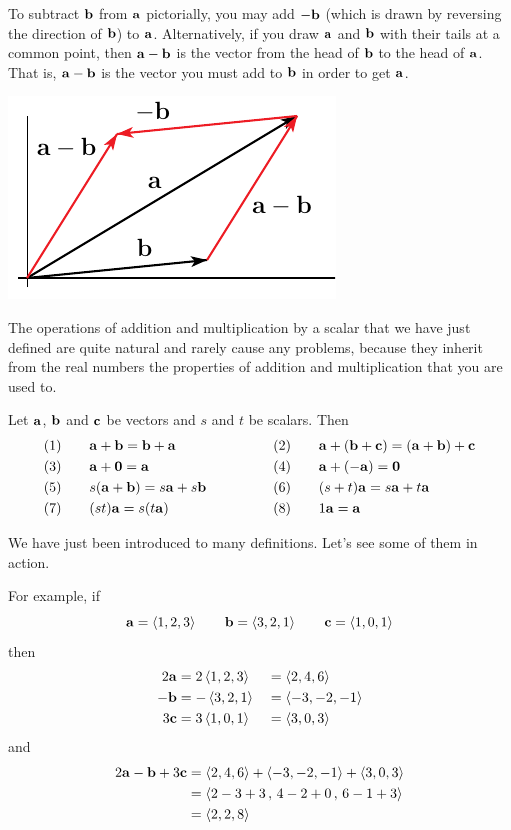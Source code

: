 To subtract $\mathbf{b}$ from $\mathbf{a}$ pictorially, 
you may add $-\mathbf{b}$ (which is drawn by reversing the direction of $\mathbf{b}$)
 to $\mathbf{a}$. Alternatively,
if you draw $\mathbf{a}$ and $\mathbf{b}$ with their tails at a common point,
then $\mathbf{a}-\mathbf{b}$ is the vector from the head of $\mathbf{b}$ to
the head of $\mathbf{a}$. That is, $\mathbf{a}-\mathbf{b}$ is the vector you
must add to $\mathbf{b}$ in order to get $\mathbf{a}$.
\begin{efig}
  \begin{center}
  \includegraphics{subtract.pdf}
  \end{center}
\end{efig}


The operations of addition and multiplication by a scalar that we have just
defined are quite natural and rarely cause any problems, because 
they inherit from the real numbers the properties of  addition and 
multiplication that you are used to. 
\begin{theorem}
                    \label{thm:addScalMult}
Let $\mathbf{a}$, $\mathbf{b}$ and $\mathbf{c}$ be vectors and $s$ and $t$ be scalars. Then 
\begin{alignat*}{5}
& (1)\quad&&\mathbf{a}+\mathbf{b}=\mathbf{b}+\mathbf{a} \qquad\qquad\qquad
&& (2)\quad&&\mathbf{a}+(\mathbf{b}+\mathbf{c})=(\mathbf{a}+\mathbf{b})+\mathbf{c}\\
& (3) &&\mathbf{a}+\mathbf{0} =\mathbf{a} 
&& (4) &&\mathbf{a}+(-\mathbf{a})=\mathbf{0}\\
& (5) &&s(\mathbf{a}+\mathbf{b})=s\mathbf{a}+s\mathbf{b}
&& (6) &&(s+t)\mathbf{a}=s\mathbf{a}+t\mathbf{a}\\
& (7) &&(st)\mathbf{a} = s(t\mathbf{a})
&& (8) &&1\mathbf{a}=\mathbf{a}\\
\end{alignat*}
\end{theorem}

\noindent We have just been introduced to many definitions. Let's
see some of them in action.
\begin{eg}
For example, if 
\begin{equation*}
\mathbf{a} = \left< 1,2,3\right>\qquad
\mathbf{b} = \left< 3,2,1\right>\qquad
\mathbf{c} = \left< 1,0,1\right>
\end{equation*}
then
\begin{alignat*}{3}
2\mathbf{a}&=2\left< 1,2,3\right>&&=\left< 2,4,6\right> \\
-\mathbf{b}&=-\left< 3,2,1\right>&&=\left< -3,-2,-1\right> \\
3\mathbf{c}&=3\left< 1,0,1\right>&&=\left< 3,0,3\right>
\end{alignat*}
and 
\begin{align*}
2\mathbf{a}-\mathbf{b}+3\mathbf{c} 
&= \left< 2,4,6\right> + \left< -3,-2,-1\right>+\left< 3,0,3\right> \\
&= \left< 2-3+3\,,\,4-2+0\,,\,6-1+3\right> \\
&= \left< 2,2,8 \right>
\end{align*}
\end{eg}\goodbreak


